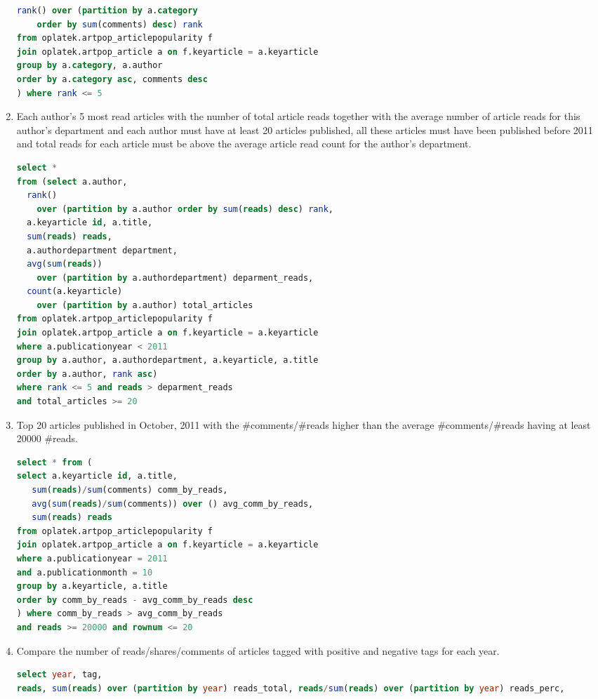 \begin{enumerate}
\begin{lstlisting}[language=sql]
  rank() over (partition by a.category 
    order by sum(comments) desc) rank 
from oplatek.artpop_articlepopularity f
join oplatek.artpop_article a on f.keyarticle = a.keyarticle
group by a.category, a.author
order by a.category asc, comments desc
) where rank <= 5
\end{lstlisting}
\item    Each author's 5 most read articles with the number of total article reads together with the average number of article reads for this author's department and each author must have at least 20 articles published, all these articles must have been published before 2011 and total reads for each article must be above the average article read count for the author's department.
\begin{lstlisting}[language=sql] 
select *
from (select a.author, 
  rank() 
    over (partition by a.author order by sum(reads) desc) rank,
  a.keyarticle id, a.title,
  sum(reads) reads, 
  a.authordepartment department,
  avg(sum(reads)) 
    over (partition by a.authordepartment) deparment_reads,
  count(a.keyarticle) 
    over (partition by a.author) total_articles
from oplatek.artpop_articlepopularity f
join oplatek.artpop_article a on f.keyarticle = a.keyarticle
where a.publicationyear < 2011
group by a.author, a.authordepartment, a.keyarticle, a.title
order by a.author, rank asc)
where rank <= 5 and reads > deparment_reads 
and total_articles >= 20
\end{lstlisting}
\item    Top 20 articles published in October, 2011 with the \#comments/\#reads higher than the average \#comments/\#reads having at least 20000 \#reads.
\begin{lstlisting}[language=sql] 
select * from (
select a.keyarticle id, a.title,
   sum(reads)/sum(comments) comm_by_reads,
   avg(sum(reads)/sum(comments)) over () avg_comm_by_reads,
   sum(reads) reads
from oplatek.artpop_articlepopularity f
join oplatek.artpop_article a on f.keyarticle = a.keyarticle
where a.publicationyear = 2011 
and a.publicationmonth = 10
group by a.keyarticle, a.title
order by comm_by_reads - avg_comm_by_reads desc
) where comm_by_reads > avg_comm_by_reads 
and reads >= 20000 and rownum <= 20
\end{lstlisting}
\item    Compare the number of reads/shares/comments of articles tagged with positive and negative tags for each year.
\begin{lstlisting}[language=sql] 
select year, tag, 
reads, sum(reads) over (partition by year) reads_total, reads/sum(reads) over (partition by year) reads_perc,

\end{lstlisting}
\end{enumerate}
